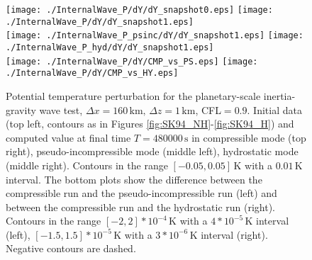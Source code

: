 \documentclass{ametsoc}
\theoremstyle{definition}
\begin{document}
 \begin{figure}
\centering
 \texttt{[image: ./InternalWave\_P/dY/dY\_snapshot0.eps]}
 \texttt{[image: ./InternalWave\_P/dY/dY\_snapshot1.eps]}\\
 \texttt{[image: ./InternalWave\_P\_psinc/dY/dY\_snapshot1.eps]}
 \texttt{[image: ./InternalWave\_P\_hyd/dY/dY\_snapshot1.eps]}\\
  \texttt{[image: ./InternalWave\_P/dY/CMP\_vs\_PS.eps]}
 \texttt{[image: ./InternalWave\_P/dY/CMP\_vs\_HY.eps]}
 \caption{Potential temperature perturbation for the planetary-scale inertia-gravity wave test,  $\Delta x=160\,\textrm{km},\,\Delta z=1\,\textrm{km}$, CFL$=0.9$. Initial data (top left, contours as in Figures \ref{fig:SK94_NH}-\ref{fig:SK94_H}) and computed value at final time $T=480000\,\textrm{s}$ in compressible mode (top right), pseudo-incompressible mode (middle left), hydrostatic mode (middle right). Contours in the range $[-0.05, 0.05]\,\textrm{K}$ with a $0.01\,\textrm{K}$ interval. The bottom plots show the difference between the compressible run and the pseudo-incompressible run (left) and between the compressible run and the hydrostatic run (right). Contours in the range $[-2, 2]*10^{-4}\,\textrm{K}$ with a $4*10^{-5}\,\textrm{K}$ interval (left), $[-1.5, 1.5]*10^{-5}\,\textrm{K}$ with a $3*10^{-6}\,\textrm{K}$ interval (right). Negative contours are dashed.}
 \label{fig:SK94_P} 
 \end{figure}

 
\end{document}
